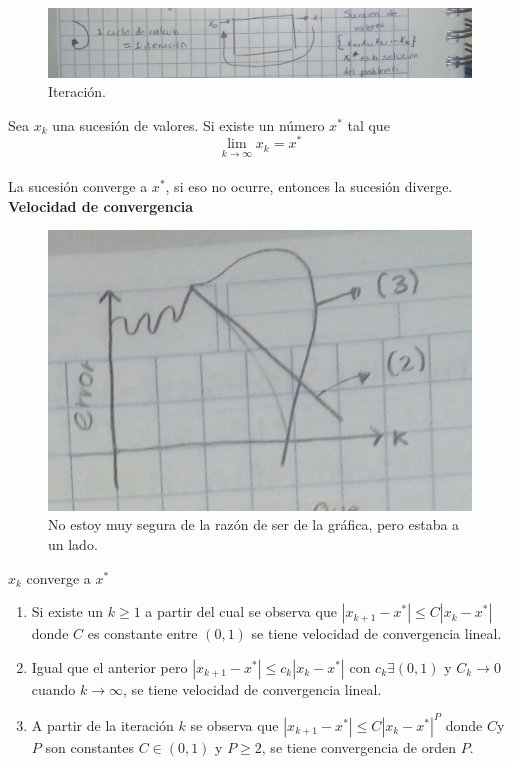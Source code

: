 \begin{figure}[h]
\includegraphics[scale=.16]{iteracion}
\centering
\caption{Iteraci\'on.}
\end{figure}

Sea $x_k$ una sucesi\'on de valores. Si existe un n\'umero $x^*$ tal que $$\lim\limits_{k\to\infty}x_k=x^*$$ \\
La sucesi\'on converge a $x^*$, si eso no ocurre, entonces la sucesi\'on diverge.
\\
\textbf{Velocidad de convergencia}\\ 
\begin{figure}[h]
\includegraphics[scale=.16]{grafica-junto-vel-conv}
\centering
\caption{No estoy muy segura de la raz\'on de ser de la gr\'afica, pero estaba a un lado.}
\end{figure}

${x_k}$ converge a $x^*$ \\
\begin{enumerate}
\item Si existe un $k\geq 1$ a partir del cual se observa que $|x_{k+1}-x^*|\leq C|x_k-x^*|$ donde $C$ es constante entre $(0,1)$ se tiene velocidad de convergencia lineal.
\item Igual que el anterior pero $|x_{k+1}-x^*|\leq c_k|x_k-x^*|$ con $c_k\exists(0,1)$ y $C_k\to0$ cuando $k\to\infty$, se tiene  velocidad de convergencia lineal.
\item A partir de la iteraci\'on $k$ se observa que $|x_{k+1}-x^*|\leq C{|x_k-x^*|}^P$ donde $C$y $P$ son constantes $C\in(0,1)$ y $P\geq2$, se tiene convergencia de orden $P$.
\end{enumerate}

